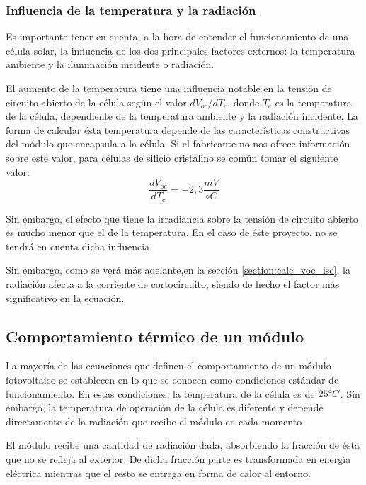 \subsubsection{Influencia de la temperatura y la radiación}

Es importante tener en cuenta, a la hora de entender el funcionamiento de una célula solar, la influencia de los dos principales factores externos: la temperatura ambiente y la iluminación incidente o radiación.

El aumento de la temperatura tiene una influencia notable en la tensión de circuito abierto de la célula según el valor $dV_{oc}/dT_c$. donde $T_c$ es la temperatura de la célula, dependiente de la temperatura ambiente y la radiación incidente. La forma de calcular ésta temperatura depende de las características constructivas del módulo que encapsula a la célula. Si el fabricante no nos ofrece información sobre este valor, para células de silicio cristalino se común tomar el siguiente valor:
\begin{equation}
\frac{dV_{oc}}{dT_c}=-2,3\frac{mV}{ \circ C}
\end{equation}

Sin embargo, el efecto que tiene la irradiancia sobre la tensión de circuito abierto es mucho menor que el de la temperatura. En el caso de éste proyecto, no se tendrá en cuenta dicha influencia.

Sin embargo, como se verá más adelante,en la sección \ref{section:calc_voc_isc}, la radiación afecta a la corriente de cortocircuito, siendo de hecho el factor más significativo en la ecuación.

\subsection{Comportamiento térmico de un módulo}
\label{section:term_behaviour}

La mayoría de las ecuaciones que definen el comportamiento de un módulo fotovoltaico se establecen en lo que se conocen como condiciones estándar de funcionamiento. En estas condiciones, la temperatura de la célula es de $25\degree C$. Sin embargo, la temperatura de operación de la célula es diferente y depende directamente de la radiación que recibe el módulo en cada momento

El módulo recibe una cantidad de radiación dada, absorbiendo la fracción de ésta que no se refleja al exterior. De dicha fracción parte es transformada en energía eléctrica mientras que el resto se entrega en forma de calor al entorno.

